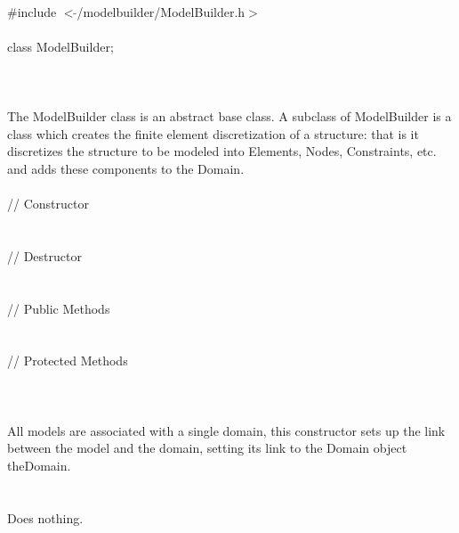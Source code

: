 
   \\
\indent \#include $<\tilde{ }$/modelbuilder/ModelBuilder.h$>$  \\

  \\
\indent class ModelBuilder;  \\

 \\
 \\

 \\ 
\indent The ModelBuilder class is an abstract base class. A subclass
of ModelBuilder is a class which creates the finite element
discretization of a structure: that is it discretizes the structure to
be modeled into Elements, Nodes, Constraints, etc. and adds these
components to the Domain.  \\

 \\
\indent // Constructor \\ 
\\ \\
\indent // Destructor \\ 
\\  \\
\indent // Public Methods \\ 
 \\ \\
\indent // Protected Methods \\
 \\

 \\ 
\\ 
All models are associated with a single domain, this constructor
sets up the link between the model and the domain, setting its link
to the Domain object \p theDomain. \\

 \\
\\ 
Does nothing. \\

